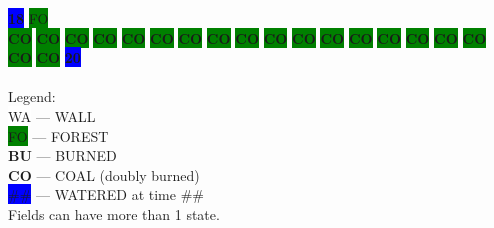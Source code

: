 \colorbox{blue}{\color[rgb]{1,0,0}\textbf{18}}%
\colorbox{green}{\color[gray]{0.75}FO}%
\\
\colorbox{green}{\color[rgb]{0,0,0}\textbf{CO}}%
\colorbox{green}{\color[rgb]{0,0,0}\textbf{CO}}%
\colorbox{green}{\color[rgb]{0,0,0}\textbf{CO}}%
\colorbox{green}{\color[rgb]{0,0,0}\textbf{CO}}%
\colorbox{green}{\color[rgb]{0,0,0}\textbf{CO}}%
\colorbox{green}{\color[rgb]{0,0,0}\textbf{CO}}%
\colorbox{green}{\color[rgb]{0,0,0}\textbf{CO}}%
\colorbox{green}{\color[rgb]{0,0,0}\textbf{CO}}%
\colorbox{green}{\color[rgb]{0,0,0}\textbf{CO}}%
\colorbox{green}{\color[rgb]{0,0,0}\textbf{CO}}%
\colorbox{green}{\color[rgb]{0,0,0}\textbf{CO}}%
\colorbox{green}{\color[rgb]{0,0,0}\textbf{CO}}%
\colorbox{green}{\color[rgb]{0,0,0}\textbf{CO}}%
\colorbox{green}{\color[rgb]{0,0,0}\textbf{CO}}%
\colorbox{green}{\color[rgb]{0,0,0}\textbf{CO}}%
\colorbox{green}{\color[rgb]{0,0,0}\textbf{CO}}%
\colorbox{green}{\color[rgb]{0,0,0}\textbf{CO}}%
\colorbox{green}{\color[rgb]{0,0,0}\textbf{CO}}%
\colorbox{green}{\color[rgb]{0,0,0}\textbf{CO}}%
\colorbox{blue}{\color[rgb]{1,0,0}\textbf{20}}%
\\
\\
Legend:\\
\colorbox{white}{\color[gray]{0.5}WA}  ---  WALL\\
\colorbox{green}{\color[gray]{0.5}FO}  ---  FOREST\\
{\color[rgb]{1,0,0}\textbf{BU}}  ---  BURNED\\
{\color[rgb]{0,0,0}\textbf{CO}}  ---  COAL (doubly burned)\\
\colorbox{blue}{\#\#}  ---  WATERED at time \#\#\\
Fields can have more than 1 state.\\
